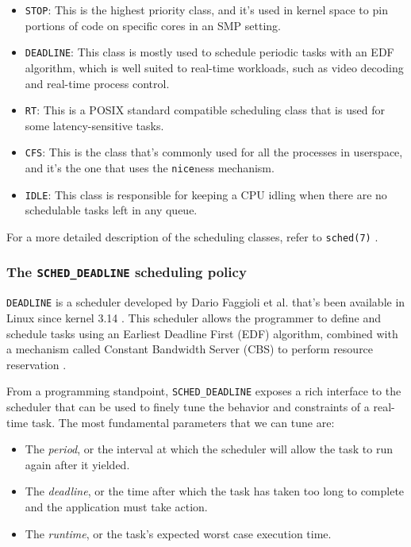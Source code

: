 \documentclass[a4paper,12pt]{report}
\begin{document}
\begin{itemize}
    \item \texttt{STOP}: This is the highest priority class, and it's used in kernel space to pin portions of code on specific cores in an SMP setting.
    \item \texttt{DEADLINE}: This class is mostly used to schedule periodic tasks with an EDF algorithm, which is well suited to real-time workloads, such as video decoding and real-time process control.
    \item \texttt{RT}: This is a POSIX standard compatible scheduling class that is used for some latency-sensitive tasks.
    \item \texttt{CFS}: This is the class that's commonly used for all the processes in userspace, and it's the one that uses the \texttt{nice}ness mechanism.
    \item \texttt{IDLE}: This class is responsible for keeping a CPU idling when there are no schedulable tasks left in any queue.
\end{itemize}

For a more detailed description of the scheduling classes, refer to \texttt{sched(7)} \cite{man-sched-7}.

\subsubsection{The \texttt{SCHED\_DEADLINE} scheduling policy}

\texttt{DEADLINE} is a scheduler developed by Dario Faggioli et al. \cite{lwn-faggioli-mail} that's been available in Linux since kernel 3.14 \cite{kn-linux-314}. This scheduler allows the programmer to define and schedule tasks using an Earliest Deadline First (EDF) algorithm, combined with a mechanism called Constant Bandwidth Server (CBS) to perform resource reservation \cite{cbs-algorithm}.

From a programming standpoint, \texttt{SCHED\_DEADLINE} exposes a rich interface to the scheduler that can be used to finely tune the behavior and constraints of a real-time task. The most fundamental parameters that we can tune are: 

\begin{itemize}
    \item The \textit{period}, or the interval at which the scheduler will allow the task to run again after it yielded.
    \item The \textit{deadline}, or the time after which the task has taken too long to complete and the application must take action.
    \item The \textit{runtime}, or the task's expected worst case execution time.
\end{itemize}
\end{document}
